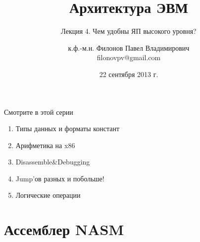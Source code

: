 \documentclass{beamer}
\title{Архитектура ЭВМ}
\subtitle{Лекция 4. Чем удобны ЯП высокого уровня?}
\author{к.ф.-м.н. Филонов Павел Владимирович \\ filonovpv@gmail.com}
\date{22 сентября 2013 г.}
\institute[МГТУ ГА] 
{
    Московский Государственный Технический Университет \\
    Гражданской Авиации
}
\begin{document}
    \frame{\titlepage}
    \begin{frame}{Смотрите в этой серии}
        \begin{enumerate}
        \pause
        \item Типы данных и форматы констант
        \pause
        \item Арифметика на x86
        \pause
        \item Disassemble\&Debugging 
        \pause
        \item Jump'ов разных и побольше!
        \pause
        \item Логические операции
        \end{enumerate}
    \end{frame}
    \section{Ассемблер NASM}
\end{document}

